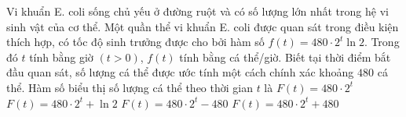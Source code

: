 \begin{ex}%
	Vi khuẩn E. coli sống chủ yếu ở đường ruột và có số lượng lớn nhất trong hệ vi sinh vật của cơ thể. Một quần thể vi khuẩn E. coli được quan sát trong điều kiện thích hợp, có tốc độ sinh trưởng được cho bởi hàm số $f(t)=480\cdot2^t \ln 2$. Trong đó $t$ tính bằng giờ $(t>0)$, $f(t)$ tính bằng cá thể/giờ. Biết tại thời điểm bắt đầu quan sát, số lượng cá thể được ước tính một cách chính xác khoảng $480$ cá thể. Hàm số biểu thị số lượng cá thể theo thời gian $t$ là
	\choice
	{\True $F(t)=480 \cdot 2^t$}
	{$F(t)=480\cdot2^t+\ln 2$}
	{$F(t)=480 \cdot 2^t-480$}
	{$F(t)=480 \cdot 2^t + 480$}
\end{ex}
